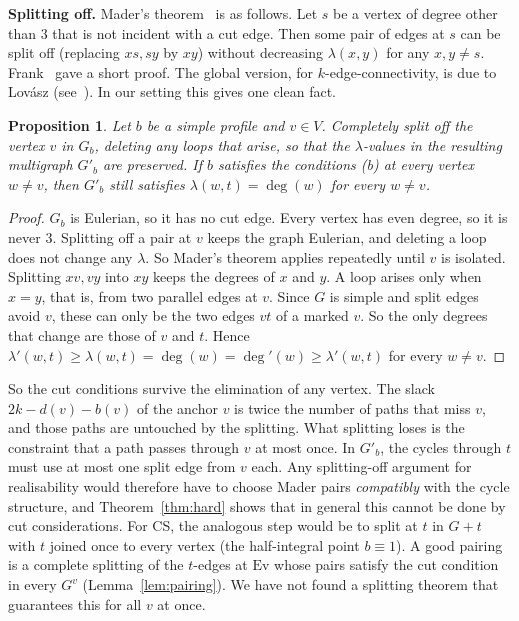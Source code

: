 \documentclass[11pt]{amsart}
\newtheorem{proposition}[theorem]{Proposition}
\theoremstyle{definition}
\newcommand{\Ev}{\mathrm{Ev}}
\begin{document}
\textbf{Splitting off.} Mader's theorem~\cite{Mad78} is as follows. Let $s$ be a vertex of degree
other than $3$ that is not incident with a cut edge. Then some pair of edges at $s$ can be split off
(replacing $xs,sy$ by $xy$) without decreasing $\lambda(x,y)$ for any $x,y\neq s$. Frank~\cite{Fr92}
gave a short proof. The global version, for $k$-edge-connectivity, is due to Lov\'asz
(see~\cite{FrankBook}). In our setting this gives one clean fact.

\begin{proposition}\label{prop:mader}
Let $b$ be a simple profile and $v\in V$. Completely split off the vertex $v$ in $G_b$, deleting any
loops that arise, so that the $\lambda$-values in the resulting multigraph $G'_b$ are preserved. If
$b$ satisfies the conditions (b) at every vertex $w\neq v$, then $G'_b$ still satisfies
$\lambda(w,t)=\deg(w)$ for every $w\neq v$.
\end{proposition}

\begin{proof}
$G_b$ is Eulerian, so it has no cut edge. Every vertex has even degree, so it is never $3$. Splitting
off a pair at $v$ keeps the graph Eulerian, and deleting a loop does not change any $\lambda$. So
Mader's theorem applies repeatedly until $v$ is isolated. Splitting $xv,vy$ into $xy$ keeps the
degrees of $x$ and $y$. A loop arises only when $x=y$, that is, from two parallel edges at $v$. Since
$G$ is simple and split edges avoid $v$, these can only be the two edges $vt$ of a marked $v$. So the
only degrees that change are those of $v$ and $t$. Hence $\lambda'(w,t)\ge\lambda(w,t)=\deg(w)=\deg'(w)
\ge\lambda'(w,t)$ for every $w\neq v$.
\end{proof}

So the cut conditions survive the elimination of any vertex. The slack $2k-d(v)-b(v)$ of the anchor
$v$ is twice the number of paths that miss $v$, and those paths are untouched by the splitting. What splitting loses is the constraint that a path passes
through $v$ at most once. In $G'_b$, the cycles through $t$ must use at most one split edge from $v$
each. Any splitting-off argument for realisability would therefore have to choose Mader pairs
\emph{compatibly} with the cycle structure, and Theorem~\ref{thm:hard} shows that in general this
cannot be done by cut considerations. For CS, the
analogous step would be to split at $t$ in $G+t$ with $t$ joined once to every vertex (the
half-integral point $b\equiv1$). A good pairing is a complete splitting of the $t$-edges at $\Ev$
whose pairs satisfy the cut condition in every $G^v$ (Lemma~\ref{lem:pairing}). We have not found a
splitting theorem that guarantees this for all $v$ at once.
\end{document}
